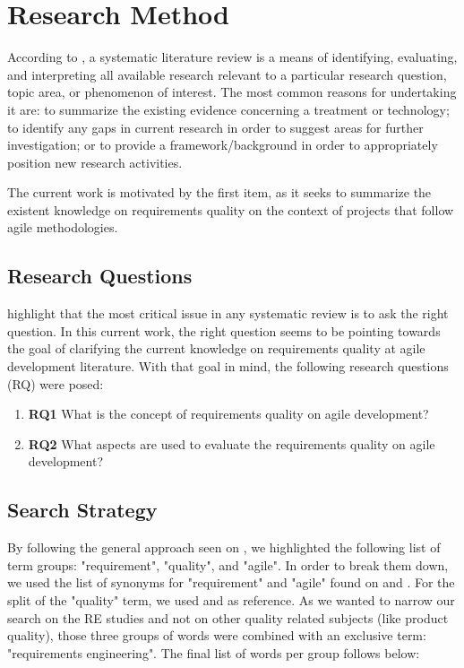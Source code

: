 \section{Research Method}

According to \cite{Kitchenham_2007}, a systematic literature review is a means of identifying, evaluating, and interpreting all available research relevant to a particular research question, topic area, or phenomenon of interest. The most common reasons for undertaking it are: to summarize the existing evidence concerning a treatment or technology; to identify any gaps in current research in order to suggest areas for further investigation; or to provide a framework/background in order to appropriately position new research activities.

The current work is motivated by the first item, as it seeks to summarize the existent knowledge on requirements quality on the context of projects that follow agile methodologies.

\subsection{Research Questions}

\cite{Kitchenham_2007} highlight that the most critical issue in any systematic review is to ask the right question. In this current work, the right question seems to be pointing towards the goal of clarifying the current knowledge on requirements quality at agile development literature. With that goal in mind, the following research questions (RQ) were posed:

\begin{enumerate}[label={}]
\item \textbf{RQ1} What is the concept of requirements quality on agile development?
\item \textbf{RQ2} What aspects are used to evaluate the requirements quality on agile development?
\end{enumerate}

\subsection{Search Strategy}

By following the general approach seen on \cite{Kitchenham_2007}, we highlighted the following list of term groups: "requirement", "quality", and "agile". In order to break them down, we used the list of synonyms for "requirement" and "agile" found on \cite{Medeiros_2015} and \cite{Inayat_2015}. For the split of the "quality" term, we used \cite{Tiwari_2015} and \cite{Attar_2012} as reference. As we wanted to narrow our search on the RE studies and not on other quality related subjects (like product quality), those three groups of words were combined with an exclusive term: "requirements engineering". The final list of words per group follows below:

